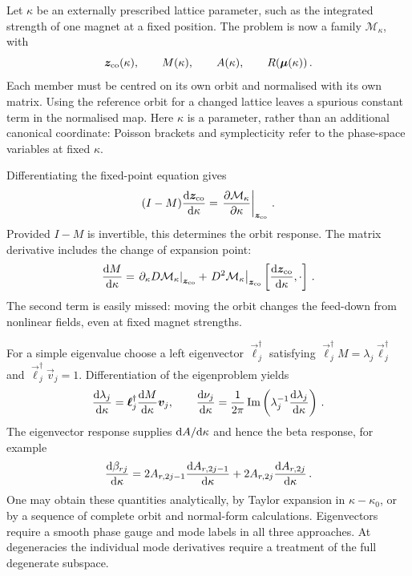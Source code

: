 Let $\kappa$ be an externally prescribed lattice parameter, such as the
integrated strength of one magnet at a fixed position. The problem is
now a family $\mathcal M_\kappa$, with
\begin{equation}\label{eq:lnf-parameter-family}
    \vec z_{\rm co}(\kappa),\qquad M(\kappa),\qquad
    A(\kappa),\qquad R(\vec\mu(\kappa))\,.
\end{equation}
Each member must be centred on its own orbit and normalised with its
own matrix. Using the reference orbit for a changed lattice leaves
a spurious constant term in the normalised map.
Here $\kappa$ is a parameter, rather than an additional canonical
coordinate: Poisson brackets and symplecticity refer to the
phase-space variables at fixed $\kappa$.

Differentiating the fixed-point equation gives
\begin{equation}\label{eq:lnf-parameter-orbit}
    (I-M)\frac{\dee\vec z_{\rm co}}{\dee\kappa} = \left.\frac{\partial\mathcal M_\kappa}{\partial\kappa}
    \right|_{\vec z_{\rm co}}\,.
\end{equation}
Provided $I-M$ is invertible, this determines the orbit response.
The matrix derivative includes the change of expansion point:
\begin{equation}\label{eq:lnf-parameter-jacobian}
    \frac{\dee M}{\dee\kappa} = \left.\partial_\kappa D\mathcal M_\kappa\right|_{\vec z_{\rm co}} + \left.D^2\mathcal M_\kappa\right|_{\vec z_{\rm co}}
    \left[\frac{\dee\vec z_{\rm co}}{\dee\kappa},\slot\right]\,.
\end{equation}
The second term is easily missed: moving the orbit changes the
feed-down from nonlinear fields, even at fixed magnet strengths.

For a simple eigenvalue choose a left eigenvector $\vec\ell_j^\dagger$
satisfying $\vec\ell_j^\dagger M = \lambda_j\vec\ell_j^\dagger$ and
$\vec\ell_j^\dagger\vec v_j = 1$. Differentiation of the eigenproblem yields
\begin{equation}\label{eq:lnf-parameter-tune}
    \frac{\dee\lambda_j}{\dee\kappa} = \vec\ell_j^\dagger\frac{\dee M}{\dee\kappa}\vec v_j,
    \qquad
    \frac{\dee\nu_j}{\dee\kappa} = \frac{1}{2\pi}\Imm\left(
    \lambda_j^{-1}\frac{\dee\lambda_j}{\dee\kappa}\right)\,.
\end{equation}
The eigenvector response supplies $\dee A/\dee\kappa$ and hence
the beta response, for example
\begin{equation}
    \frac{\dee\beta_{rj}}{\dee\kappa} = 2A_{r,2j-1}\frac{\dee A_{r,2j-1}}{\dee\kappa} + 2A_{r,2j}\frac{\dee A_{r,2j}}{\dee\kappa}\,.
\end{equation}
One may obtain these quantities analytically, by Taylor expansion
in $\kappa-\kappa_0$, or by a sequence of complete orbit and
normal-form calculations. Eigenvectors require a smooth phase gauge
and mode labels in all three approaches. At degeneracies the
individual mode derivatives require a treatment of the full
degenerate subspace.

